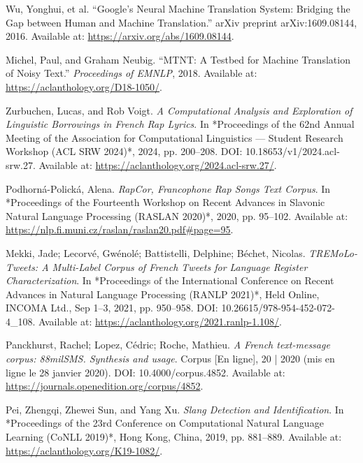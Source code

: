 \documentclass[12pt]{article}
\begin{document}
\begin{thebibliography}{9}
Wu, Yonghui, et al. “Google’s Neural Machine Translation System: Bridging the Gap between Human and Machine Translation.” 
arXiv preprint arXiv:1609.08144, 2016. Available at: \url{https://arxiv.org/abs/1609.08144}.

Michel, Paul, and Graham Neubig. “MTNT: A Testbed for Machine Translation of Noisy Text.”
\textit{Proceedings of EMNLP}, 2018. Available at: \url{https://aclanthology.org/D18-1050/}.

Zurbuchen, Lucas, and Rob Voigt.  
\textit{A Computational Analysis and Exploration of Linguistic Borrowings in French Rap Lyrics}.  
In *Proceedings of the 62nd Annual Meeting of the Association for Computational Linguistics — Student Research Workshop (ACL SRW 2024)*, 2024, pp. 200–208.  
DOI: 10.18653/v1/2024.acl-srw.27.  
Available at: \url{https://aclanthology.org/2024.acl-srw.27/}.

Podhorná-Polická, Alena.  
\textit{RapCor, Francophone Rap Songs Text Corpus}.  
In *Proceedings of the Fourteenth Workshop on Recent Advances in Slavonic Natural Language Processing (RASLAN 2020)*, 2020, pp. 95–102.  
Available at: \url{https://nlp.fi.muni.cz/raslan/raslan20.pdf#page=95}.  %

Mekki, Jade; Lecorvé, Gwénolé; Battistelli, Delphine; Béchet, Nicolas.  
\textit{TREMoLo-Tweets: A Multi-Label Corpus of French Tweets for Language Register Characterization}.  
In *Proceedings of the International Conference on Recent Advances in Natural Language Processing (RANLP 2021)*, Held Online, INCOMA Ltd., Sep 1–3, 2021, pp. 950–958.  
DOI: 10.26615/978-954-452-072-4\_108.  
Available at: \url{https://aclanthology.org/2021.ranlp-1.108/}.

Panckhurst, Rachel; Lopez, Cédric; Roche, Mathieu.  
\textit{A French text-message corpus: 88milSMS. Synthesis and usage}.  
Corpus [En ligne], 20 | 2020 (mis en ligne le 28 janvier 2020).  
DOI: 10.4000/corpus.4852.  
Available at: \url{https://journals.openedition.org/corpus/4852}.

Pei, Zhengqi, Zhewei Sun, and Yang Xu.  
\textit{Slang Detection and Identification}.  
In *Proceedings of the 23rd Conference on Computational Natural Language Learning (CoNLL 2019)*, Hong Kong, China, 2019, pp. 881–889.  
Available at: \url{https://aclanthology.org/K19-1082/}.  %


\end{thebibliography}
\end{document}
